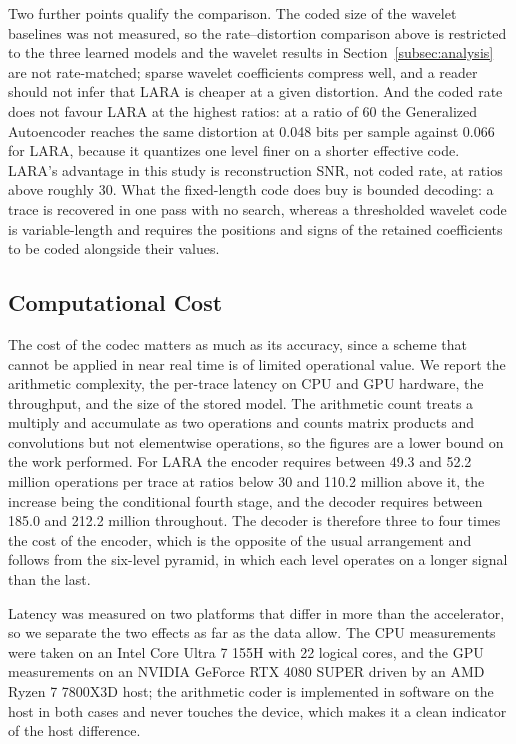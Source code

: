 \documentclass[fleqn,10pt]{wlscirep}
\begin{document}
Two further points qualify the comparison. The coded size of the wavelet baselines was not measured, so the rate--distortion comparison above is restricted to the three learned models and the wavelet results in Section~\ref{subsec:analysis} are not rate-matched; sparse wavelet coefficients compress well, and a reader should not infer that LARA is cheaper at a given distortion. And the coded rate does not favour LARA at the highest ratios: at a ratio of 60 the Generalized Autoencoder reaches the same distortion at 0.048 bits per sample against 0.066 for LARA, because it quantizes one level finer on a shorter effective code. LARA's advantage in this study is reconstruction SNR, not coded rate, at ratios above roughly 30. What the fixed-length code does buy is bounded decoding: a trace is recovered in one pass with no search, whereas a thresholded wavelet code is variable-length and requires the positions and signs of the retained coefficients to be coded alongside their values.

\subsection{Computational Cost}
\label{subsec:cost}

The cost of the codec matters as much as its accuracy, since a scheme that cannot be applied in near real time is of limited operational value. We report the arithmetic complexity, the per-trace latency on CPU and GPU hardware, the throughput, and the size of the stored model. The arithmetic count treats a multiply and accumulate as two operations and counts matrix products and convolutions but not elementwise operations, so the figures are a lower bound on the work performed. For LARA the encoder requires between 49.3 and 52.2 million operations per trace at ratios below 30 and 110.2 million above it, the increase being the conditional fourth stage, and the decoder requires between 185.0 and 212.2 million throughout. The decoder is therefore three to four times the cost of the encoder, which is the opposite of the usual arrangement and follows from the six-level pyramid, in which each level operates on a longer signal than the last.

Latency was measured on two platforms that differ in more than the accelerator, so we separate the two effects as far as the data allow. The CPU measurements were taken on an Intel Core Ultra 7 155H with 22 logical cores, and the GPU measurements on an NVIDIA GeForce RTX 4080 SUPER driven by an AMD Ryzen 7 7800X3D host; the arithmetic coder is implemented in software on the host in both cases and never touches the device, which makes it a clean indicator of the host difference.
\end{document}
